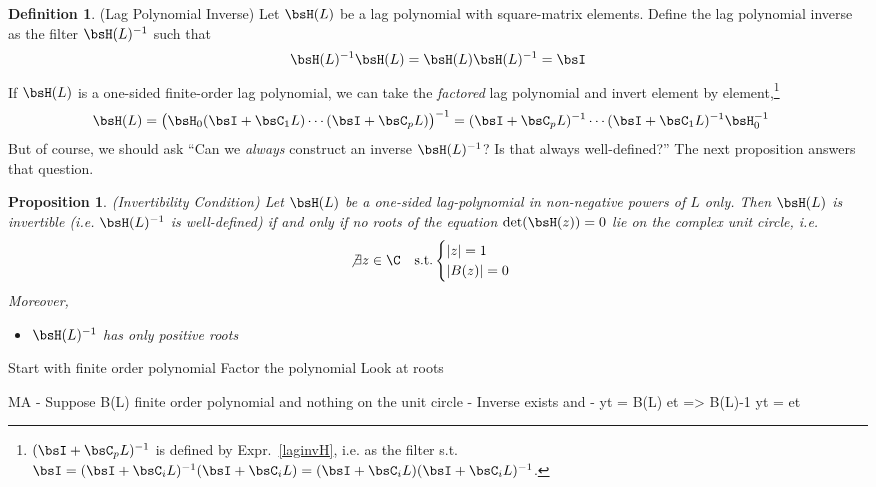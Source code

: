 \documentclass[12pt]{article}
\theoremstyle{plain}
\newtheorem{prop}[thm]{Proposition}
\theoremstyle{definition}
\newtheorem{defn}[thm]{Definition}
\theoremstyle{remark}
\newcommand{\bsPsi}{\boldsymbol{\Psi}}
\begin{document}
\begin{defn}(Lag Polynomial Inverse)
Let $\bsH(L)$ be a lag polynomial  with square-matrix elements. Define
the lag polynomial inverse as the filter $\bsH(L)^{-1}$ such that
\begin{align} 
  \bsH(L)^{-1}\bsH(L) =
  \bsH(L)\bsH(L)^{-1} = \bsI
  \label{laginvH}
\end{align}
If $\bsH(L)$ is a one-sided finite-order lag polynomial, we can take the
\emph{factored} lag polynomial and invert element by element,\footnote{%
  $(\bsI+\bsC_pL)^{-1}$ is defined by Expr.~\ref{laginvH}, i.e.
  as the filter s.t.
  $\bsI=(\bsI+\bsC_iL)^{-1}(\bsI+\bsC_iL)=(\bsI+\bsC_iL)(\bsI+\bsC_iL)^{-1}$.
}
\begin{align*}
  \bsH(L)
  &= \big(\bsH_0(\bsI+\bsC_1 L)\cdots(\bsI+\bsC_pL)\big)^{-1}
  = (\bsI+\bsC_pL)^{-1}\cdots(\bsI+\bsC_1 L)^{-1}\bsH_0^{-1}
\end{align*}
But of course, we should ask ``Can we \emph{always} construct an inverse
$\bsH(L)^{-1}$? Is that always well-defined?'' The next proposition
answers that question.
\end{defn}

\begin{prop}\emph{(Invertibility Condition)}
Let $\bsH(L)$ be a one-sided lag-polynomial in \emph{non-negative}
powers of $L$ only.
Then $\bsH(L)$ is invertible (i.e. $\bsH(L)^{-1}$ is well-defined) if
and only if \emph{no roots} of the equation $\det(\bsH(z))=0$ lie on the
complex unit circle, i.e.
\begin{align*}
  \not\exists
  z\in\C\quad
  \text{s.t.}
  \begin{cases}
    |z|=1 \\
    |B(z)|=0
  \end{cases}
\end{align*}
Moreover,
\begin{itemize}
  \item $\bsH(L)^{-1}$ has only positive roots
\end{itemize}
\end{prop}

Start with finite order polynomial
Factor the polynomial
Look at roots

MA
- Suppose B(L) finite order polynomial and nothing on the unit circle
- Inverse exists and
- yt = B(L) et => B(L)-1 yt = et
\end{document}
